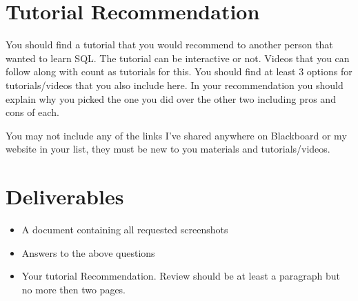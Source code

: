 \documentclass[12pt]{article}
\begin{document}
    \section*{Tutorial Recommendation}
You should find a tutorial that you would recommend to another person that wanted to learn SQL.  The tutorial can be interactive or not.  Videos that you can follow along with count as tutorials for this. You should find at least 3 options for tutorials/videos that you also include here. In your recommendation you should explain why you picked the one you did over the other two including pros and cons of each. 

You may not include any of the links I've shared anywhere on Blackboard or my website in your list, they must be new to you materials and tutorials/videos. 


\section*{Deliverables}
\begin{itemize}
    \item A document containing all requested screenshots
    \item Answers to the above questions
    \item Your tutorial Recommendation.  Review should be at least a paragraph but no more then two pages. 
\end{itemize} 
\end{document}

